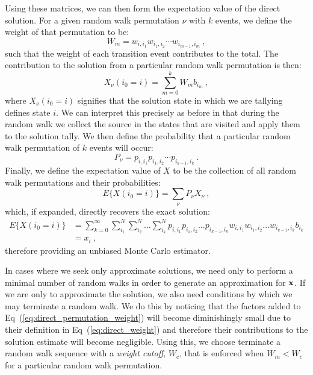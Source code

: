 Using these matrices, we can then form the expectation value of the
direct solution. For a given random walk permutation $\nu$ with $k$
events, we define the weight of that permutation to be:
\begin{equation}
  W_{m} = w_{i,i_1} w_{i_1,i_2} \cdots w_{i_{m-1},i_m}\:,
  \label{eq:direct_permutation_weight}
\end{equation}
such that the weight of each transition event contributes to the
total. The contribution to the solution from a particular random walk
permutation is then:
\begin{equation}
  X_{\nu}(i_0 = i) = \sum_{m=0}^k W_{m} b_{i_m}\:,
  \label{eq:direct_permutation_contribution}
\end{equation}
where $X_{\nu}(i_0 = i)$ signifies that the solution state in which we
are tallying defines state $i$.  We can interpret this precisely as
before in that during the random walk we collect the source in the
states that are visited and apply them to the solution tally. We then
define the probability that a particular random walk permutation of
$k$ events will occur:
\begin{equation}
  P_{\nu} = p_{i,i_1} p_{i_1,i_2} \cdots p_{i_{k-1},i_k}\:.
  \label{eq:direct_permutation_probability}
\end{equation}
Finally, we define the expectation value of $X$ to be the collection
of all random walk permutations and their probabilities:
\begin{equation}
  E\{X(i_0 = i)\} = \sum_{\nu} P_{\nu} X_{\nu}\:,
  \label{eq:direct_expectation_value}
\end{equation}
which, if expanded, directly recovers the exact solution:
\begin{equation}
  \begin{split}
    E\{X(i_0 = i)\}
    &=\sum_{k=0}^{\infty}\sum_{i_1}^{N}\sum_{i_2}^{N}\ldots
    \sum_{i_k}^{N} p_{i,i_1}p_{i_1,i_2}\ldots p_{i_{k-1},i_k}
    w_{i,i_1}w_{i_1,i_2}\ldots w_{i_{k-1},i_k} b_{i_k}\\ &= x_i\:,
  \end{split}
  \label{eq:direct_expectation_expansion}
\end{equation}
therefore providing an unbiased Monte Carlo estimator. 

In cases where we seek only approximate solutions, we need only to
perform a minimal number of random walks in order to generate an
approximation for $\mathbf{x}$. If we are only to approximate the
solution, we also need conditions by which we may terminate a random
walk. We do this by noticing that the factors added to
Eq~(\ref{eq:direct_permutation_weight}) will become diminishingly
small due to their definition in Eq~(\ref{eq:direct_weight}) and
therefore their contributions to the solution estimate will become
negligible. Using this, we choose terminate a random walk sequence
with a \textit{weight cutoff}, $W_c$, that is enforced when $W_m <
W_c$ for a particular random walk permutation.

